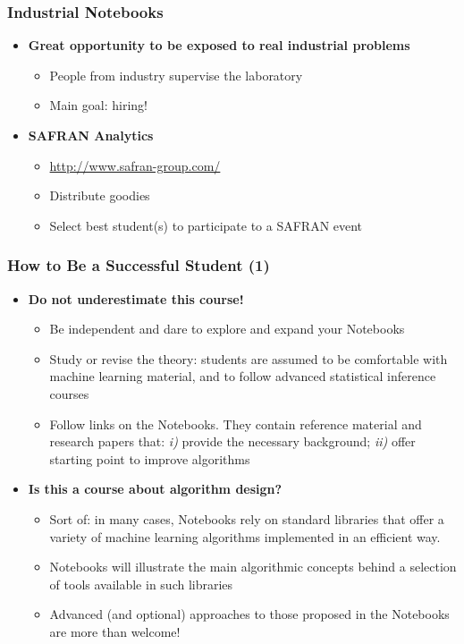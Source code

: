 \begin{frame}\frametitle{Industrial Notebooks}
\begin{itemize}
	\item {\bf Great opportunity to be exposed to real industrial problems}
	\begin{itemize}
		\item People from industry supervise the laboratory
		\item Main goal: hiring!
	\end{itemize}
	\item {\bf SAFRAN Analytics}
	\begin{itemize}
		\item \url{http://www.safran-group.com/}
		\item Distribute goodies
		\item Select best student(s) to participate to a SAFRAN event
	\end{itemize}
\end{itemize}
\end{frame}

\begin{frame}\frametitle{How to Be a Successful Student (1)}
\begin{itemize}
	\item {\bf Do not underestimate this course!}
	\begin{itemize}
		\item Be independent and dare to explore and expand your Notebooks
		\item Study or revise the theory: students are assumed to be comfortable with machine learning material, and to follow advanced statistical inference courses
		\item Follow links on the Notebooks. They contain reference material and research papers that: \emph{i)} provide the necessary background; \emph{ii)} offer starting point to improve algorithms
	\end{itemize}
	\item {\bf Is this a course about algorithm design?}
	\begin{itemize}
		\item Sort of: in many cases, Notebooks rely on standard libraries that offer a variety of machine learning algorithms implemented in an efficient way.
		\item Notebooks will illustrate the main algorithmic concepts behind a selection of tools available in such libraries
		\item Advanced (and optional) approaches to those proposed in the Notebooks are more than welcome!
	\end{itemize}
\end{itemize}
\end{frame}

